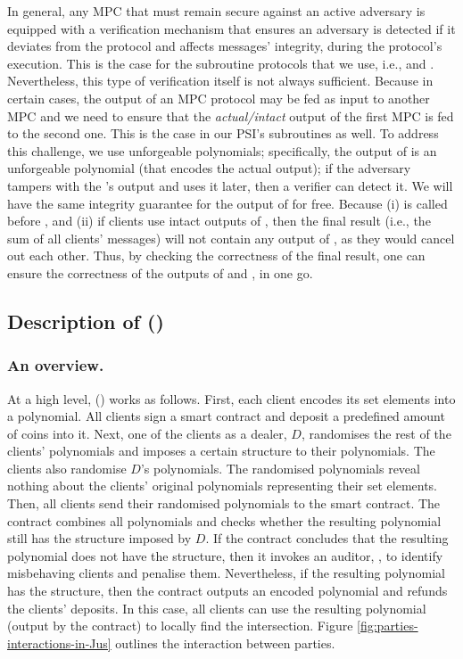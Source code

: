  In general, any MPC that must remain secure against an active adversary is equipped with a verification mechanism that ensures an adversary is detected if it deviates from the protocol and affects messages' integrity, during the protocol's execution. This is the case for the subroutine protocols that we use, i.e., \vopr and \zspaa. Nevertheless, this type of verification itself is not always sufficient. Because in certain cases, the output of an MPC protocol may be fed as input to another MPC and we need to ensure that the \emph{actual/intact} output of the first MPC is fed to the second one. This is the case in our PSI's subroutines as well. To address this challenge, we use unforgeable polynomials; specifically, the output of \vopr is an unforgeable polynomial (that encodes the actual output); if the adversary tampers with the \vopr's output and uses it later, then a verifier can detect it. We will have the same integrity guarantee for the output of \zspaa for free. Because (i) \vopr is called before \zspaa, and (ii) if clients use intact outputs of \zspaa, then the final result (i.e., the sum of all clients' messages) will not contain any output of \zspaa, as they would cancel out each other. Thus, by checking the correctness of the final result, one can ensure the correctness of the outputs of \vopr and \zspaa, in one go. 
 
 
 


  
\subsection{Description of \withFai (\fpsi)}\label{Fair-PSI-Protocol}

\subsubsection{An overview.} At a high level, \withFai (\fpsi) works as follows. First, each client encodes its set elements into a polynomial. All clients sign a smart contract and deposit a predefined amount of coins into it.  Next,  one of the clients as a dealer, $D$, randomises the rest of the clients' polynomials and imposes a certain structure to their polynomials. The clients also randomise $D$'s polynomials. The randomised polynomials reveal nothing about the clients' original polynomials representing their set elements. Then, all clients send their randomised polynomials to the smart contract.  The contract combines all polynomials and checks whether the resulting polynomial still has the structure imposed by $D$. If the contract concludes that the resulting polynomial does not have the structure, then it invokes an auditor, \aud, to identify misbehaving clients and penalise them. Nevertheless, if the resulting polynomial has the structure, then the contract outputs an encoded polynomial and refunds the clients' deposits. In this case, all clients can use the resulting polynomial (output by the contract) to locally find the intersection. Figure \ref{fig:parties-interactions-in-Jus} outlines the interaction between parties. 


